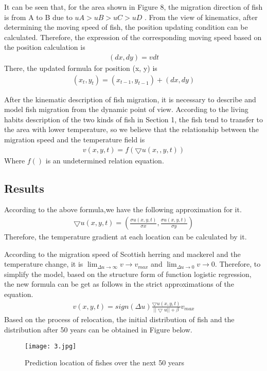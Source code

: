 \documentclass[12pt]{article}  %
\begin{document}
It can be seen that, for the area shown in Figure 8, the migration direction of fish is from A to B 
due to $ uA > uB > uC > uD $ . From the view of kinematics, after determining
the moving speed of fish, the position updating condition can be calculated. Therefore, the
expression of the corresponding moving speed based on the position calculation is
\begin{align} %
    (dx, dy) = vdt
\end{align}
There, the updated formula for position (x, y) is
\begin{align} %
    (x_{t}, y_{t}) = (x_{t-1}, y_{t-1}) + (dx, dy)
\end{align}

After the kinematic description of fish migration, it is necessary to describe and model
fish migration from the dynamic point of view. According to the living habits description of
the two kinds of fish in Section 1, the fish tend to transfer to the area with lower temperature,
so we believe that the relationship between the migration speed and the temperature field is
\begin{align} %
    v(x,y,t) = f(\bigtriangledown u(x,,y,t))
\end{align}
Where $f()$ is an undetermined relation equation.

\subsection{Results}
According to the above formula,we have the following approximation for it.
\begin{align} %
    \bigtriangledown u(x,y,t) = (\frac{\sigma u(x,y,t)}{\sigma x}, \frac{\sigma u(x,y,t)}{\sigma y}) 
\end{align}
Therefore, the temperature gradient at each location can be calculated by it.

According to the migration speed of Scottish herring and mackerel and the temperature
change, it is $\lim_{\Delta u \to \infty}v \to v_{max}$ and $\lim_{\Delta u \to 0}v \to 0 $. Therefore, to simplify the model, based
on the structure form of function logistic regression, the new formula can be get as follows
in the strict approximations of the equation.
\begin{align} %
    v(x,y,t) = sign(\Delta u)\frac{\bigtriangledown u(x,y,t)}{|| \bigtriangledown u || + \beta}v_{max}
\end{align}
Based on the process of relocation, the initial distribution of fish and the distribution
after 50 years can be obtained in Figure below.
\begin{figure}[htbp]  %
    \centering  %
    \texttt{[image: 3.jpg]} %
    \caption{Prediction location of fishes over the next 50 years} %
\end{figure}
\end{document}
